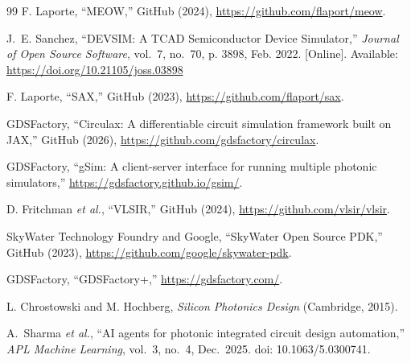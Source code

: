 \documentclass[]{spie}  %
\begin{document}
\begin{thebibliography}{99}
 F. Laporte, ``MEOW,'' GitHub (2024), \url{https://github.com/flaport/meow}.

 J.~E. Sanchez, ``{DEVSIM}: {A} {TCAD} {Semiconductor} {Device} {Simulator},'' \emph{Journal of Open Source Software}, vol.~7, no.~70, p. 3898, Feb. 2022. [Online]. Available: \url{https://doi.org/10.21105/joss.03898}

 F. Laporte, ``SAX,'' GitHub (2023), \url{https://github.com/flaport/sax}.

 GDSFactory, ``Circulax: A differentiable circuit simulation framework built on JAX,'' GitHub (2026), \url{https://github.com/gdsfactory/circulax}.

 GDSFactory, ``gSim: A client-server interface for running multiple photonic simulators,'' \url{https://gdsfactory.github.io/gsim/}.

 D. Fritchman \textit{et al.}, ``VLSIR,'' GitHub (2024), \url{https://github.com/vlsir/vlsir}.

 SkyWater Technology Foundry and Google, ``SkyWater Open Source PDK,'' GitHub (2023), \url{https://github.com/google/skywater-pdk}.

 GDSFactory, ``GDSFactory+,'' \url{https://gdsfactory.com/}.

 L. Chrostowski and M. Hochberg, \textit{Silicon Photonics Design} (Cambridge, 2015).

A.~Sharma \emph{et al.}, ``AI agents for photonic integrated circuit design automation,'' \emph{APL Machine Learning}, vol.~3, no.~4, Dec.~2025. doi: 10.1063/5.0300741. %

\end{thebibliography}
\end{document}
